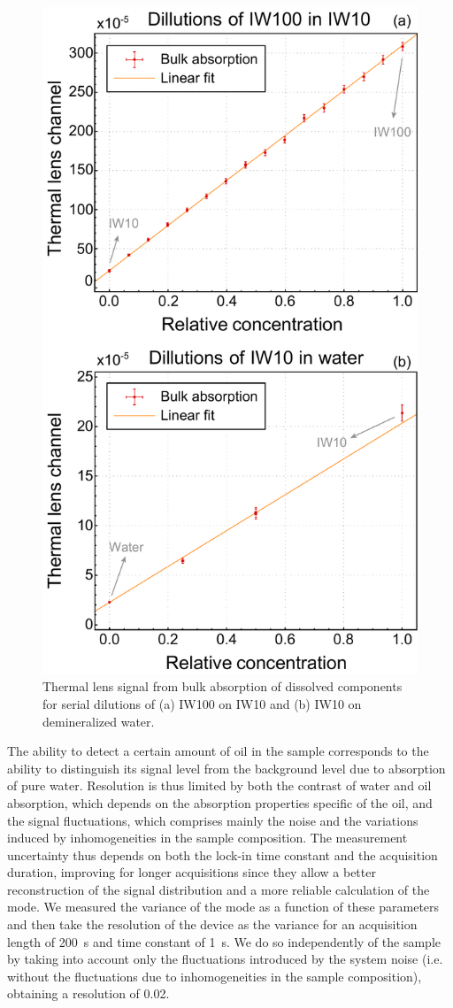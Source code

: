 \documentclass[9pt,twocolumn,twoside]{osajnl}
\begin{document}
\begin{figure}[t!]
	\centering \includegraphics[width=.46\textwidth]{figures/IWvsC.pdf}
	\caption{Thermal lens signal from bulk absorption of dissolved components for serial dilutions of (a) IW100 on IW10 and (b) IW10 on demineralized water.}
	\label{fig:BulkAbsorption}
\end{figure}

The ability to detect a certain amount of oil in the sample corresponds to the ability to distinguish its signal level from the background level due to absorption of pure water. Resolution is thus limited by both the contrast of water and oil absorption, which depends on the absorption properties specific of the oil, and the signal fluctuations, which comprises mainly the noise and the variations induced by inhomogeneities in the sample composition. The measurement uncertainty thus depends on both the lock-in time constant and the acquisition duration, improving for longer acquisitions since they allow a better reconstruction of the signal distribution and a more reliable calculation of the mode. We measured the variance of the mode as a function of these parameters and then take the resolution of the device as the variance for an acquisition length of \SI{200}{\s} and time constant of \SI{1}{\s}. We do so independently of the sample by taking into account only the fluctuations introduced by the system noise (i.e. without the fluctuations due to inhomogeneities in the sample composition), obtaining a resolution of \SI{0.02}{\ppm}.
\end{document}

